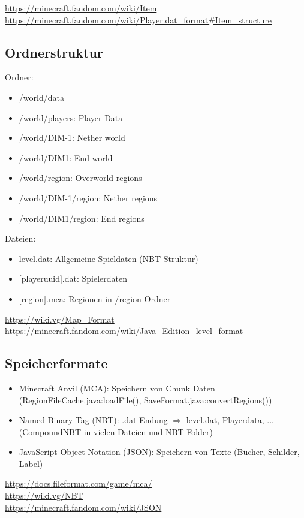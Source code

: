 \url{https://minecraft.fandom.com/wiki/Item}\\
\url{https://minecraft.fandom.com/wiki/Player.dat_format#Item_structure}

\subsection{Ordnerstruktur}
Ordner:
\begin{itemize}
    \item /world/data
    \item /world/players: Player Data
    \item /world/DIM-1: Nether world
    \item /world/DIM1: End world
    \item /world/region: Overworld regions
    \item /world/DIM-1/region: Nether regions
    \item /world/DIM1/region: End regions
\end{itemize}

Dateien:
\begin{itemize}
    \item level.dat: Allgemeine Spieldaten (NBT Struktur)
    \item $[$playeruuid$]$.dat: Spielerdaten
    \item $[$region$]$.mca: Regionen in /region Ordner
\end{itemize}

\url{https://wiki.vg/Map_Format}\\
\url{https://minecraft.fandom.com/wiki/Java_Edition_level_format}

\subsection{Speicherformate}
\begin{itemize}
    \item Minecraft Anvil (MCA): Speichern von Chunk Daten (RegionFileCache.java:loadFile(), SaveFormat.java:convertRegions())
    \item Named Binary Tag (NBT): .dat-Endung $\Rightarrow$ level.dat, Playerdata, ... (CompoundNBT in vielen Dateien und NBT Folder)
    \item JavaScript Object Notation (JSON): Speichern von Texte (Bücher, Schilder, Label)
\end{itemize}

\url{https://docs.fileformat.com/game/mca/}\\
\url{https://wiki.vg/NBT}\\
\url{https://minecraft.fandom.com/wiki/JSON}

